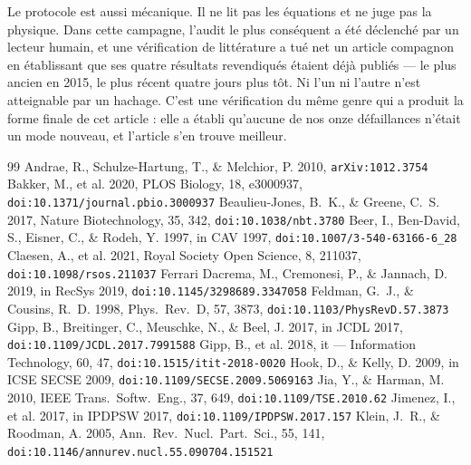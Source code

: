 \documentclass[11pt,a4paper]{article}
\begin{document}
Le protocole est aussi mécanique. Il ne lit pas les équations et ne juge pas la physique. Dans
cette campagne, l'audit le plus conséquent a été déclenché par un lecteur humain, et une
vérification de littérature a tué net un article compagnon en établissant que ses quatre
résultats revendiqués étaient déjà publiés --- le plus ancien en 2015, le plus récent quatre
jours plus tôt. Ni l'un ni l'autre n'est atteignable par un hachage. C'est une vérification du
même genre qui a produit la forme finale de cet article : elle a établi qu'aucune de nos onze
défaillances n'était un mode nouveau, et l'article s'en trouve meilleur.

\begin{thebibliography}{99}
 Andrae, R., Schulze-Hartung, T., \& Melchior, P.
  2010, \texttt{arXiv:1012.3754}
 Bakker, M., et al. 2020, PLOS Biology, 18,
  e3000937, \texttt{doi:10.1371/journal.pbio.3000937}
 Beaulieu-Jones, B.~K., \& Greene, C.~S.
  2017, Nature Biotechnology, 35, 342, \texttt{doi:10.1038/nbt.3780}
 Beer, I., Ben-David, S., Eisner, C., \& Rodeh, Y.
  1997, in CAV 1997, \texttt{doi:10.1007/3-540-63166-6\_28}
 Claesen, A., et al. 2021, Royal Society Open
  Science, 8, 211037, \texttt{doi:10.1098/rsos.211037}
 Ferrari Dacrema, M., Cremonesi, P., \&
  Jannach, D. 2019, in RecSys 2019, \texttt{doi:10.1145/3298689.3347058}
 Feldman, G.~J., \& Cousins, R.~D. 1998,
  Phys.\ Rev.\ D, 57, 3873, \texttt{doi:10.1103/PhysRevD.57.3873}
 Gipp, B., Breitinger, C., Meuschke, N., \&
  Beel, J. 2017, in JCDL 2017, \texttt{doi:10.1109/JCDL.2017.7991588}
 Gipp, B., et al. 2018, it --- Information
  Technology, 60, 47, \texttt{doi:10.1515/itit-2018-0020}
 Hook, D., \& Kelly, D. 2009, in ICSE SECSE 2009,
  \texttt{doi:10.1109/SECSE.2009.5069163}
 Jia, Y., \& Harman, M. 2010, IEEE Trans.\ Softw.\
  Eng., 37, 649, \texttt{doi:10.1109/TSE.2010.62}
 Jimenez, I., et al. 2017, in IPDPSW 2017,
  \texttt{doi:10.1109/IPDPSW.2017.157}
 Klein, J.~R., \& Roodman, A. 2005, Ann.\ Rev.\
  Nucl.\ Part.\ Sci., 55, 141, \texttt{doi:10.1146/annurev.nucl.55.090704.151521}

\end{thebibliography}
\end{document}
